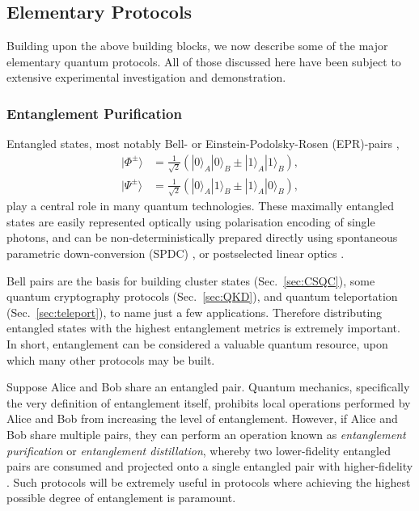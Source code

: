 \documentclass[aps,rmp,twocolumn,amsmath,amssymb,nofootinbib,superscriptaddress]{revtex4}
\newcommand{\ket}[1]{|#1\rangle}
\begin{document}
%
%

\subsection{Elementary Protocols}

Building upon the above building blocks, we now describe some of the major elementary quantum protocols. All of those discussed here have been subject to extensive experimental investigation and demonstration.

%
%

\subsubsection{Entanglement Purification} \label{sec:ent_purif}

Entangled states, most notably Bell- or Einstein-Podolsky-Rosen (EPR)-pairs \cite{???},
\begin{align} \label{eq:bell_basis}
\ket{\Phi^{\pm}} &= \frac{1}{\sqrt{2}} (\ket{0}_A\ket{0}_B \pm \ket{1}_A\ket{1}_B), \nonumber \\
\ket{\Psi^{\pm}} &= \frac{1}{\sqrt{2}} (\ket{0}_A\ket{1}_B \pm \ket{1}_A\ket{0}_B),
\end{align}
play a central role in many quantum technologies. These maximally entangled states are easily represented optically using polarisation encoding of single photons, and can be non-deterministically prepared directly using spontaneous parametric down-conversion (SPDC) \cite{???}, or postselected linear optics \cite{???}.

Bell pairs are the basis for building cluster states (Sec.~\ref{sec:CSQC}), some quantum cryptography protocols (Sec.~\ref{sec:QKD}), and quantum teleportation (Sec.~\ref{sec:teleport}), to name just a few applications. Therefore distributing entangled states with the highest entanglement metrics is extremely important. In short, entanglement can be considered a valuable quantum resource, upon which many other protocols may be built.

Suppose Alice and Bob share an entangled pair. Quantum mechanics, specifically the very definition of entanglement itself, prohibits local operations performed by Alice and Bob from increasing the level of entanglement. However, if Alice and Bob share multiple pairs, they can perform an operation known as \emph{entanglement purification} or \emph{entanglement distillation}, whereby two lower-fidelity entangled pairs are consumed and projected onto a single entangled pair with higher-fidelity \cite{???}. Such protocols will be extremely useful in protocols where achieving the highest possible degree of entanglement is paramount.
\end{document}
